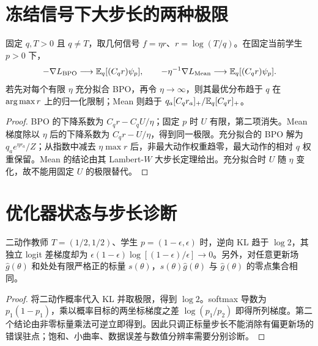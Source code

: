 \section{冻结信号下大步长的两种极限}
\begin{proposition}[固定候选梯度极限与充分拟合极限]
\label{prop:large-step-orders}
固定 $q,T>0$ 且 $q\ne T$，取几何信号 $f=\eta r$、$r=\log(T/q)$。在固定当前学生 $p>0$ 下，
\begin{equation}
-\nabla L_{\rm BPO}\longrightarrow\mathbb E_q[(C_qr)\psi_p],
\qquad
-\eta^{-1}\nabla L_{\rm Mean}\longrightarrow\mathbb E_q[(C_qr)\psi_p].
\end{equation}
若先对每个有限 $\eta$ 充分拟合 BPO，再令 $\eta\to\infty$，则其最优分布趋于 $q$ 在 $\operatorname*{arg\,max} r$ 上的归一化限制；Mean 则趋于 $q_a[C_qr_a]_+/\mathbb E_q[C_qr]_+$。
\end{proposition}
\begin{proof}
BPO 的下降系数为 $C_qr-C_qU/\eta$；固定 $p$ 时 $U$ 有限，第二项消失。Mean 梯度除以 $\eta$ 后的下降系数为 $C_qr-U/\eta$，得到同一极限。充分拟合的 BPO 解为 $q_ae^{\eta r_a}/Z$；从指数中减去 $\eta\max r$ 后，非最大动作权重趋零，最大动作的相对 $q$ 权重保留。Mean 的结论由其 Lambert-$W$ 大步长定理给出。充分拟合时 $U$ 随 $\eta$ 变化，故不能用固定 $U$ 的极限替代。
\end{proof}

\section{优化器状态与步长诊断}
\begin{proposition}
\label{prop:saturation-scalar}
二动作教师 $T=(1/2,1/2)$、学生 $p=(1-\epsilon,\epsilon)$ 时，逆向 KL 趋于 $\log2$，其独立 logit 差梯度却为 $\epsilon(1-\epsilon)\log[(1-\epsilon)/\epsilon]\to0$。另外，对任意更新场 $\widehat g(\theta)$ 和处处有限严格正的标量 $s(\theta)$，$s(\theta)\widehat g(\theta)$ 与 $\widehat g(\theta)$ 的零点集合相同。
\end{proposition}
\begin{proof}
将二动作概率代入 KL 并取极限，得到 $\log2$。softmax 导数为 $p_1(1-p_1)$，乘以概率目标的两坐标梯度之差 $\log(p_1/p_2)$ 即得所列梯度。第二个结论由非零标量乘法可逆立即得到。因此只调正标量步长不能消除有偏更新场的错误驻点；饱和、小曲率、数据误差与数值分辨率需要分别诊断。
\end{proof}

